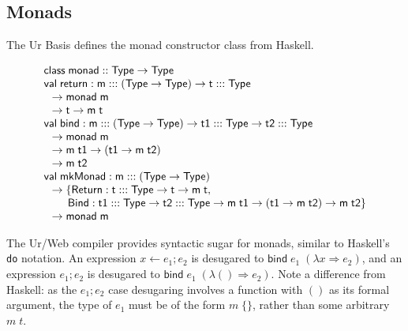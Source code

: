 \documentclass{article}
\newcommand{\cd}[1]{\texttt{#1}}
\newcommand{\mt}[1]{\mathsf{#1}}
\begin{document}
\subsection{Monads}

The Ur Basis defines the monad constructor class from Haskell.

$$\begin{array}{l}
  \mt{class} \; \mt{monad} :: \mt{Type} \to \mt{Type} \\
  \mt{val} \; \mt{return} : \mt{m} ::: (\mt{Type} \to \mt{Type}) \to \mt{t} ::: \mt{Type} \\
  \hspace{.1in} \to \mt{monad} \; \mt{m} \\
  \hspace{.1in} \to \mt{t} \to \mt{m} \; \mt{t} \\
  \mt{val} \; \mt{bind} : \mt{m} ::: (\mt{Type} \to \mt{Type}) \to \mt{t1} ::: \mt{Type} \to \mt{t2} ::: \mt{Type} \\
  \hspace{.1in} \to \mt{monad} \; \mt{m} \\
  \hspace{.1in} \to \mt{m} \; \mt{t1} \to (\mt{t1} \to \mt{m} \; \mt{t2}) \\
  \hspace{.1in} \to \mt{m} \; \mt{t2} \\
  \mt{val} \; \mt{mkMonad} : \mt{m} ::: (\mt{Type} \to \mt{Type}) \\
  \hspace{.1in} \to \{\mt{Return} : \mt{t} ::: \mt{Type} \to \mt{t} \to \mt{m} \; \mt{t}, \\
  \hspace{.3in} \mt{Bind} : \mt{t1} ::: \mt{Type} \to \mt{t2} ::: \mt{Type} \to \mt{m} \; \mt{t1} \to (\mt{t1} \to \mt{m} \; \mt{t2}) \to \mt{m} \; \mt{t2}\} \\
  \hspace{.1in} \to \mt{monad} \; \mt{m}
\end{array}$$

The Ur/Web compiler provides syntactic sugar for monads, similar to Haskell's \cd{do} notation.  An expression $x \leftarrow e_1; e_2$ is desugared to $\mt{bind} \; e_1 \; (\lambda x \Rightarrow e_2)$, and an expression $e_1; e_2$ is desugared to $\mt{bind} \; e_1 \; (\lambda () \Rightarrow e_2)$.  Note a difference from Haskell: as the $e_1; e_2$ case desugaring involves a function with $()$ as its formal argument, the type of $e_1$ must be of the form $m \; \{\}$, rather than some arbitrary $m \; t$.
\end{document}
